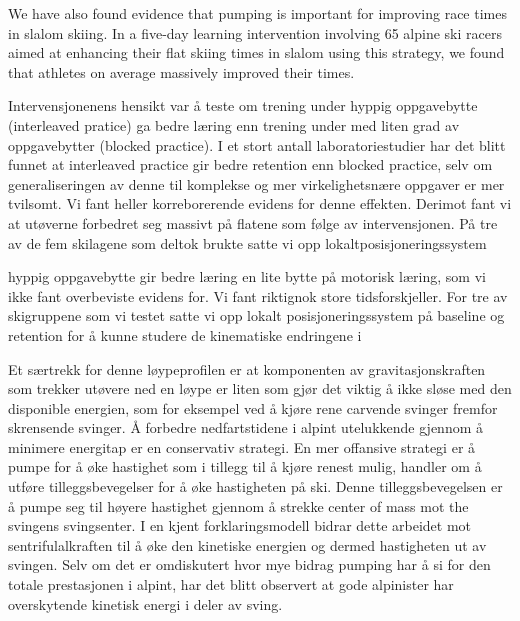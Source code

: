 \documentclass{article}
\begin{document}
We have also found evidence that pumping is important for improving race times in slalom skiing. In a five-day learning intervention involving 65 alpine ski racers aimed at enhancing their flat skiing times in slalom using this strategy, we found that athletes on average massively improved their times.


Intervensjonenens hensikt var å teste om trening under hyppig oppgavebytte (interleaved pratice) ga bedre læring enn trening under med liten grad av oppgavebytter (blocked practice). I et stort antall laboratoriestudier har det blitt funnet at interleaved practice gir bedre retention enn blocked practice, selv om generaliseringen av denne til komplekse og mer virkelighetsnære oppgaver er mer tvilsomt. Vi fant heller korreborerende evidens for denne effekten. Derimot fant vi at utøverne forbedret seg massivt på flatene som følge av intervensjonen. På tre av de fem skilagene som deltok brukte satte vi opp lokaltposisjoneringssystem







hyppig oppgavebytte gir bedre læring en lite bytte på motorisk læring, som vi ikke fant overbeviste evidens for. Vi fant riktignok store tidsforskjeller. For tre av skigruppene som vi testet satte vi opp lokalt posisjoneringssystem på baseline og retention for å kunne studere de kinematiske endringene i


 


Et særtrekk for denne løypeprofilen er at komponenten av gravitasjonskraften som trekker utøvere ned en løype er liten som gjør det viktig å ikke sløse med den disponible energien, som for eksempel ved å kjøre rene carvende svinger fremfor skrensende svinger. Å forbedre nedfartstidene i alpint utelukkende gjennom å minimere energitap er en conservativ strategi. En mer offansive strategi er å pumpe for å øke hastighet som i tillegg til å kjøre renest mulig, handler om å utføre tilleggsbevegelser for å øke hastigheten på ski. Denne tilleggsbevegelsen er å pumpe seg til høyere hastighet gjennom å strekke center of mass mot the svingens svingsenter. I en kjent forklaringsmodell bidrar dette arbeidet mot sentrifulalkraften til å øke den kinetiske energien og dermed hastigheten ut av svingen. Selv om det er omdiskutert hvor mye bidrag pumping har å si for den totale prestasjonen i alpint, har det blitt observert at gode alpinister har overskytende kinetisk energi i deler av sving. 
\end{document}
